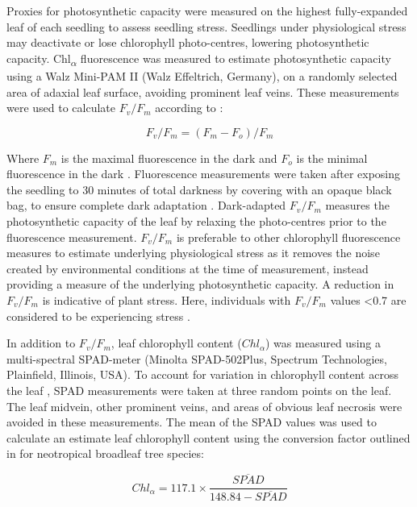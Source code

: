 \documentclass[a4paper, 11pt]{article}
\begin{document}
Proxies for photosynthetic capacity were measured on the highest fully-expanded leaf of each seedling to assess seedling stress. Seedlings under physiological stress may deactivate or lose chlorophyll photo-centres, lowering photosynthetic capacity. Chl\textsubscript{$\alpha$} fluorescence was measured to estimate photosynthetic capacity using a Walz Mini-PAM II (Walz Effeltrich, Germany), on a randomly selected area of adaxial leaf surface, avoiding prominent leaf veins. These measurements were used to calculate $F_v/F_m$ according to \citet{Genty1989}:

\begin{equation} \label{eq:fvfm}
F_v/F_m = (F_m - F_o)/F_m
\end{equation}

Where $F_m$ is the maximal fluorescence in the dark and $F_o$ is the minimal fluorescence in the dark \citep{Maxwell2000}. Fluorescence measurements were taken after exposing the seedling to 30 minutes of total darkness by covering with an opaque black bag, to ensure complete dark adaptation \citep{Campbell2007}. Dark-adapted $F_v/F_m$ measures the photosynthetic capacity of the leaf by relaxing the photo-centres prior to the fluorescence measurement. $F_v/F_m$ is preferable to other chlorophyll fluorescence measures to estimate underlying physiological stress as it removes the noise created by environmental conditions at the time of measurement, instead providing a measure of the underlying photosynthetic capacity. A reduction in $F_v/F_m$ is indicative of plant stress. Here, individuals with $F_v/F_m$ values \textless{}0.7 are considered to be experiencing stress \citep{Maxwell2000}. 

In addition to $F_v/F_m$, leaf chlorophyll content ($Chl_\alpha$) was measured using a multi-spectral SPAD-meter (Minolta SPAD-502Plus, Spectrum Technologies, Plainfield, Illinois, USA). To account for variation in chlorophyll content across the leaf \citep{Serrano2008}, SPAD measurements were taken at three random points on the leaf. The leaf midvein, other prominent veins, and areas of obvious leaf necrosis were avoided in these measurements. The mean of the SPAD values was used to calculate an estimate leaf chlorophyll content using the conversion factor outlined in \citet{Coste2010} for neotropical broadleaf tree species:

\begin{equation} \label{eq:chl-spad}
Chl_\alpha = 117.1 \times \frac{\overline{SPAD}}{148.84 - \overline{SPAD}}
\end{equation}
\end{document}
